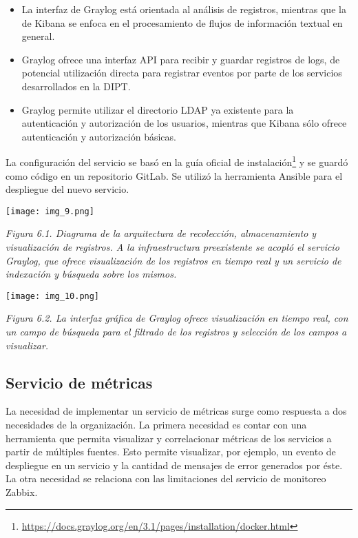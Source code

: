 \begin{itemize}
\item La interfaz de Graylog está orientada al análisis de registros, mientras que la de Kibana se enfoca en el procesamiento de flujos de información textual en general.
\item Graylog ofrece una interfaz API para recibir y guardar registros de logs, de potencial utilización directa para registrar eventos por parte de los servicios desarrollados en la DIPT.
\item Graylog permite utilizar el directorio LDAP ya existente para la autenticación y autorización de los usuarios, mientras que Kibana sólo ofrece autenticación y autorización básicas.
\end{itemize}
La configuración del servicio se basó en la guía oficial de instalación\footnote{ \href{https://docs.graylog.org/en/3.1/pages/installation/docker.html}{https://docs.graylog.org/en/3.1/pages/installation/docker.html} } y se guardó como código en un repositorio GitLab. Se utilizó la herramienta Ansible para el despliegue del nuevo servicio.

\texttt{[image: img\_9.png]}


\textit{Figura 6.1. Diagrama de la arquitectura de recolección, almacenamiento y visualización de registros. A la infraestructura preexistente se acopló el servicio Graylog, que ofrece visualización de los registros en tiempo real y un servicio de indexación y búsqueda sobre los mismos.}

\texttt{[image: img\_10.png]}


\textit{Figura 6.2. La interfaz gráfica de Graylog ofrece visualización en tiempo real, con un campo de búsqueda para el filtrado de los registros y selección de los campos a visualizar.}

\subsection{Servicio de métricas}

La necesidad de implementar un servicio de métricas surge como respuesta a dos necesidades de la organización. La primera necesidad es contar con una herramienta que permita visualizar y correlacionar métricas de los servicios a partir de múltiples fuentes. Esto permite visualizar, por ejemplo, un evento de despliegue en un servicio y la cantidad de mensajes de error generados por éste. La otra necesidad se relaciona con las limitaciones del servicio de monitoreo Zabbix. 

